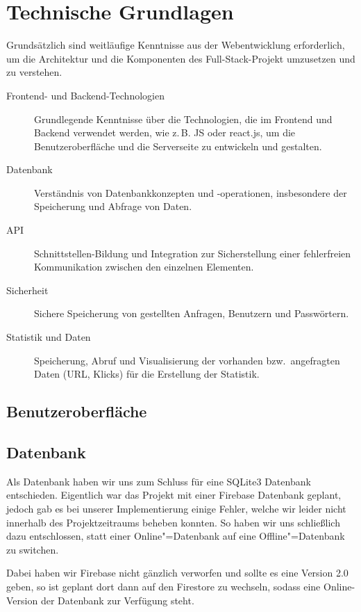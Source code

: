 \documentclass[a4paper,11pt,DIV=12,overfullrule=on]{scrreprt}%
\begin{document}
\chapter{Technische Grundlagen}
Grundsätzlich sind weitläufige Kenntnisse aus der Webentwicklung erforderlich, um die Architektur und die Komponenten des Full-Stack-Projekt umzusetzen und zu verstehen.

\begin{description}
    \item[Frontend- und Backend-Technologien] Grundlegende Kenntnisse über die Technologien, die im Frontend und Backend verwendet werden, wie z.\,B. \ac{JS} oder \mbox{react.js}, um die Benutzeroberfläche und die Serverseite zu entwickeln und gestalten.

    \item[Datenbank] Verständnis von Datenbankkonzepten und -operationen, insbesondere der Speicherung und Abfrage von Daten.

    \item[API] Schnittstellen-Bildung und Integration zur Sicherstellung einer fehlerfreien Kommunikation zwischen den einzelnen Elementen.

    \item[Sicherheit] Sichere Speicherung von gestellten Anfragen, Benutzern und Passwörtern.

    \item[Statistik und Daten] Speicherung, Abruf und Visualisierung der vorhanden bzw.\ angefragten Daten (\ac{URL}, Klicks) für die Erstellung der Statistik.
\end{description}

\section{Benutzeroberfläche}
\section{Datenbank}
Als Datenbank haben wir uns zum Schluss für eine SQLite3 Datenbank entschieden. Eigentlich war das Projekt mit einer Firebase Datenbank geplant, jedoch gab es bei unserer Implementierung einige Fehler, welche wir leider nicht innerhalb des Projektzeitraums beheben konnten. So haben wir uns schließlich dazu entschlossen, statt einer Online"=Datenbank auf eine Offline"=Datenbank zu switchen.

Dabei haben wir Firebase nicht gänzlich verworfen und sollte es eine Version 2.0 geben, so ist geplant dort dann auf den Firestore zu wechseln, sodass eine Online-Version der Datenbank zur Verfügung steht.
\end{document}
